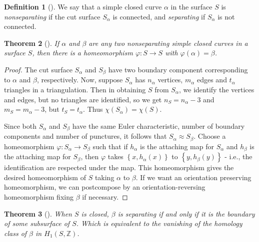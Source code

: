 \documentclass[reqno]{amsart}
\newtheorem{theorem}{Theorem}[section]
\theoremstyle{definition}
\newtheorem{definition}[theorem]{Definition}
\theoremstyle{remark}
\begin{document}
\begin{definition}[]
    We say that a simple closed curve $\alpha$ in the surface
    $S$ is \textit{nonseparating} if the cut surface
    $S_{\alpha}$ is connected, and \textit{separating} if
    $S_{\alpha}$ is not connected.
\end{definition}


\begin{theorem}[]
    If $\alpha$ and $\beta$ are any two nonseparating simple
    closed curves in a surface $S$, then there
    is a homeomorphism $\varphi \colon S \to S$ with
    $\varphi \left( \alpha \right) = \beta$.
\end{theorem}

\begin{proof}
    The cut surface $S_{\alpha}$ and $S_{\beta}$ have
    two boundary component corresponding to $\alpha$ and 
    $\beta$, respectively. 
    Now, suppose $S_{\alpha}$ has
    $n_{\alpha}$ vertices, $m_{\alpha}$ edges and
    $t_{\alpha}$ triangles in a triangulation. Then
    in obtaining $S$ from $S_{\alpha}$, we identify the vertices
    and edges, but no triangles are identified, so we get
    $n_{S} = n_{\alpha}-3$ and $m_{S} = m_{\alpha}-3$, but
    $t_{S} = t_{\alpha}$. Thus $\chi (S_{\alpha}) = 
    \chi (S)$.

    Since both $S_{\alpha}$ and
    $S_{\beta}$ have the same Euler characteristic, number of
    boundary components and number of punctures, it follows
    that $S_{\alpha} \approx S_{\beta}$. Choose
    a homeomorphism $\varphi \colon S_{\alpha} \to S_{\beta}$ such 
    that if $h_{\alpha}$ is the attaching map for $S_{\alpha}$ 
    and $h_{\beta}$ is the attaching map for $S_{\beta}$,
    then $\varphi$ takes $\left\{ x, h_{\alpha}(x) \right\} $ 
    to $\left\{ y, h_{\beta}(y) \right\} $ - i.e., the
    identification are respected under the map.
    This homeomorphism gives the desired
    homeomorphism of $S$ taking $\alpha$ to $\beta$.
    If we want an orientation preserving homeomorphism, we
    can postcompose by an orientation-reversing homeomorphism
    fixing $\beta$ if necessary.
\end{proof}

\begin{theorem}[]
    When $S$ is closed, $\beta$ is separating if and only
    if it is the boundary of some subsurface of $S$. Which
    is equivalent to the vanishing of the
    homology class of $\beta$ in $H_1 \left( S, \mathbb{Z} \right) $.
\end{theorem}
\end{document}

